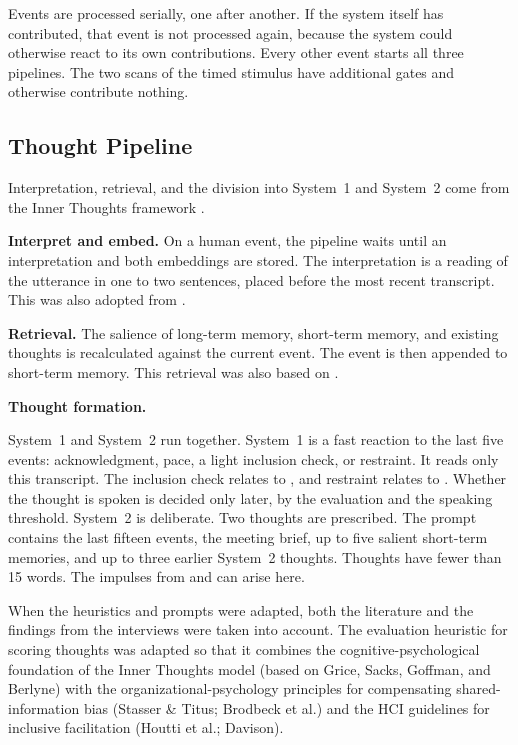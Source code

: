 Events are processed serially, one after another.
If the system itself has contributed, that event is not processed again, because the
system could otherwise react to its own contributions.
Every other event starts all three pipelines.
The two scans of the timed stimulus have additional gates and otherwise contribute nothing.

\subsection{Thought Pipeline}

Interpretation, retrieval, and the division into System~1 and System~2 come from the Inner Thoughts framework
\cite{liuProactiveConversationalAgents2025}.

\textbf{Interpret and embed.}
On a human event, the pipeline waits until an interpretation and both embeddings are stored.
The interpretation is a reading of the utterance in one to two sentences, placed before the most recent
transcript.
This was also adopted from \cite{liuProactiveConversationalAgents2025}.

\textbf{Retrieval.}
The salience of long-term memory, short-term memory, and existing thoughts is recalculated against the
current event.
The event is then appended to short-term memory.
This retrieval was also based on \cite{liuProactiveConversationalAgents2025}.

\textbf{Thought formation.}

System~1 and System~2 run together.
System~1 is a fast reaction to the last five events: acknowledgment, pace, a light
inclusion check, or restraint.
It reads only this transcript.
The inclusion check relates to , and restraint relates to .
Whether the thought is spoken is decided only later, by the evaluation and the speaking threshold.
System~2 is deliberate. Two thoughts are prescribed.
The prompt contains the last fifteen events, the meeting brief, up to five salient
short-term memories, and up to three earlier System~2 thoughts.
Thoughts have fewer than 15 words.
The impulses from  and  can arise here.

When the heuristics and prompts were adapted, both the literature and the findings from the
interviews were taken into account. The evaluation heuristic for scoring thoughts was adapted so that it
combines the cognitive-psychological foundation of the Inner Thoughts model (based on Grice, Sacks, Goffman, and
Berlyne) with the organizational-psychology principles for compensating shared-information bias (Stasser \&
Titus; Brodbeck et al.) and the HCI guidelines for inclusive facilitation (Houtti et al.; Davison).


